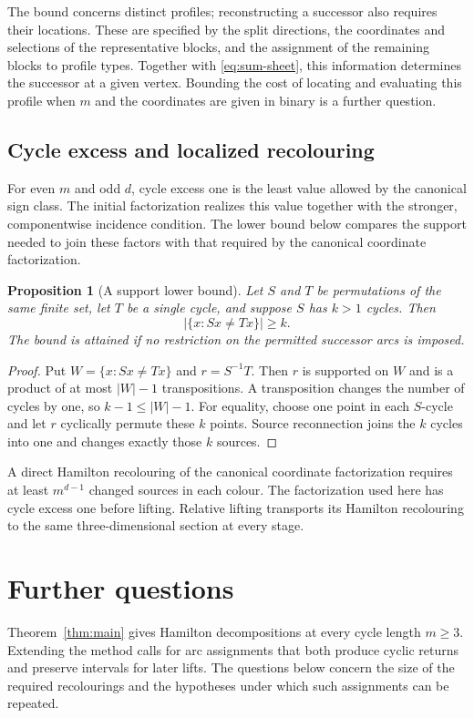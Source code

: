 \documentclass[11pt,reqno]{amsart}
\numberwithin{equation}{section}
\newtheorem{proposition}[theorem]{Proposition}
\theoremstyle{definition}
\theoremstyle{remark}
\begin{document}
The bound concerns distinct profiles; reconstructing a successor also
requires their locations. These are specified by the split directions,
the coordinates and selections of the representative blocks, and the
assignment of the remaining blocks to profile types. Together with
\eqref{eq:sum-sheet}, this information determines the successor at a
given vertex. Bounding the cost of locating and evaluating this profile
when $m$ and the coordinates are given in binary is a further question.

\subsection{Cycle excess and localized recolouring}
For even $m$ and odd $d$, cycle excess one is the least value allowed
by the canonical sign class. The initial factorization realizes this
value together with the stronger, componentwise incidence condition.
The lower bound below compares the support needed to join these
factors with that required by the canonical coordinate factorization.

\begin{proposition}[A support lower bound]\label{prop:support-lower}
Let $S$ and $T$ be permutations of the same finite set, let $T$ be a
single cycle, and suppose $S$ has $k>1$ cycles. Then
\[
 |\{x:Sx\ne Tx\}|\ge k.
\]
The bound is attained if no restriction on the permitted successor arcs
is imposed.
\end{proposition}
\begin{proof}
Put $W=\{x:Sx\ne Tx\}$ and $r=S^{-1}T$.
Then $r$ is supported on $W$ and is a product of at most $|W|-1$
transpositions. A transposition changes the number of cycles by one,
so $k-1\le |W|-1$. For equality, choose one point in each $S$-cycle
and let $r$ cyclically permute these $k$ points. Source reconnection
joins the $k$ cycles into one and changes exactly those $k$ sources.
\end{proof}

A direct Hamilton recolouring of the canonical coordinate factorization
requires at least $m^{d-1}$ changed sources in each colour. The
factorization used here has cycle excess one before lifting. Relative
lifting transports its Hamilton recolouring to the same three-dimensional
section at every stage.


\section{Further questions}\label{sec:extensions}
Theorem~\ref{thm:main} gives Hamilton decompositions at every cycle
length $m\ge3$. Extending the method calls for arc assignments that
both produce cyclic returns and preserve intervals for later lifts.
The questions below concern the size of the required recolourings and
the hypotheses under which such assignments can be repeated.
\end{document}
